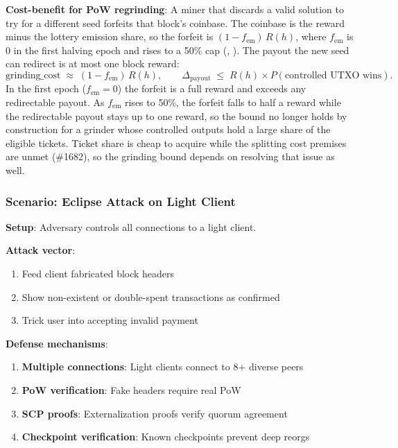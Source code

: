 \textbf{Cost-benefit for PoW regrinding}: A miner that discards a valid
solution to try for a different seed forfeits that block's coinbase. The
coinbase is the reward minus the lottery emission share, so the forfeit is
$(1-f_{\text{em}})\,R(h)$, where $f_{\text{em}}$ is 0 in the first halving
epoch and rises to a 50\% cap (,
). The payout the new seed can redirect is at
most one block reward:
\[
\text{grinding\_cost} \;\approx\; (1-f_{\text{em}})\,R(h),
\qquad
\Delta_{\text{payout}} \;\leq\; R(h) \times P(\text{controlled UTXO wins}).
\]
In the first epoch ($f_{\text{em}} = 0$) the forfeit is a full reward and
exceeds any redirectable payout. As $f_{\text{em}}$ rises to 50\%, the forfeit
falls to half a reward while the redirectable payout stays up to one reward,
so the bound no longer holds by construction for a grinder whose controlled
outputs hold a large share of the eligible tickets. Ticket share is cheap to
acquire while the splitting cost premises are unmet (\#1682), so the grinding
bound depends on resolving that issue as well.

\subsubsection{Scenario: Eclipse Attack on Light Client}

\textbf{Setup}: Adversary controls all connections to a light client.

\textbf{Attack vector}:
\begin{enumerate}
  \item Feed client fabricated block headers
  \item Show non-existent or double-spent transactions as confirmed
  \item Trick user into accepting invalid payment
\end{enumerate}

\textbf{Defense mechanisms}:
\begin{enumerate}
  \item \textbf{Multiple connections}: Light clients connect to 8+ diverse
    peers
  \item \textbf{PoW verification}: Fake headers require real PoW
  \item \textbf{SCP proofs}: Externalization proofs verify quorum agreement
  \item \textbf{Checkpoint verification}: Known checkpoints prevent deep
    reorgs
\end{enumerate}

